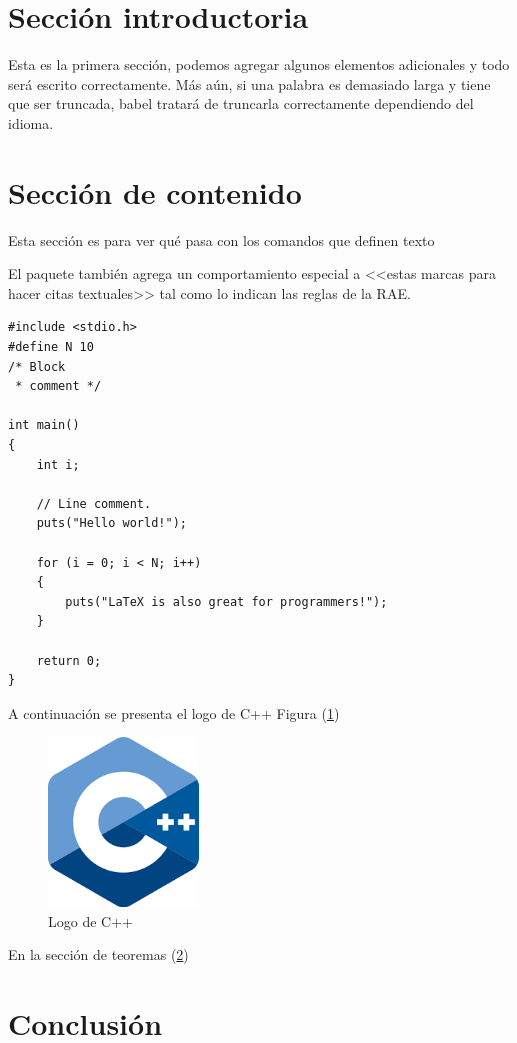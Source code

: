 \documentclass{article}
\begin{document}
\section{Sección introductoria}
Esta es la primera sección, podemos agregar algunos elementos adicionales y todo será escrito correctamente. Más aún, si una palabra es demasiado larga y tiene que ser truncada, babel tratará de truncarla correctamente dependiendo del idioma.

\section{Sección de contenido} \label{contenido}

Esta sección es para ver qué pasa con los comandos 
que definen texto

El paquete también agrega un comportamiento especial 
a <<estas marcas para hacer citas textuales>> tal como 
lo indican las reglas de la RAE.%

\begin{lstlisting}
#include <stdio.h>
#define N 10
/* Block
 * comment */

int main()
{
    int i;

    // Line comment.
    puts("Hello world!");
    
    for (i = 0; i < N; i++)
    {
        puts("LaTeX is also great for programmers!");
    }

    return 0;
}
\end{lstlisting}

A continuación se presenta el logo de C++ Figura (\ref{fig:cpplogo})

\begin{figure}[htp]
\includegraphics[width=4cm]{cpplogo.png}
\centering
\caption{Logo de C++}
\label{fig:cpplogo}
\end{figure}

En la sección de teoremas (\ref{contenido})

\section{Conclusión} \label{conclulsion}
\end{document}
